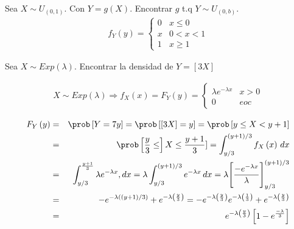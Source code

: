 \begin{Ejem}

Sea $X \sim U_{\left(0,1 \right)}$. Con $Y= g\left( X \right)$. Encontrar $g$ t.q $Y\sim U_{\left( 0,b\right)}$.\\

\begin{eqnarray*}  
 f_{Y}\left(y\right)= \left\{
 \begin{array}{cc} 
 0 & x\leq 0\\
 x & 0<x<1\\
 1 & x\geq 1     
 \end{array}
 \right.
 \end{eqnarray*}
 

\end{Ejem}

\begin{Ejem}

Sea $X \sim Exp  \left( \lambda \right)$. Encontrar la densidad de $Y = \left[ 3X \right] $

\begin{eqnarray*}
X \sim Exp \left( \lambda \right) \Rightarrow f_{X}\left( x \right) = F_{Y}\left(y\right) = \left\{\begin{array}{ll} \lambda  e^{-\lambda x} & x > 0 \\ 
0 & eoc 
\end{array}
\right.
\end{eqnarray*}

\begin{eqnarray*}
F_{Y}\left( y \right) &=& \prob \left[ Y= 7y \right] = \prob \left[ \left[ 3X\right] = y \right] = \prob \left[ y \leq X < y+1 \right]\\
&=& \prob \left[ \dfrac{y}{3} \leq \right] X \leq \dfrac{y+1}{3}] = \int_{y/3}^{(y+1)/3 }   f_{X} \left(x \right) \, dx \\
&=& \int_{y/3}^{\frac{y+1}{3} } \lambda e^{-\lambda x}, dx = \lambda \int_{y/3}^{(y+1)/3 } e^{-\lambda x} \, dx = \lambda \Bigg[ \dfrac{-e^{-\lambda x}}{\lambda} \Bigg]_{y/3}^{(y+1)/3} \\
&=& -e^{-\lambda \left((y+1)/3 \right)} + e^{-\lambda \left(\frac{y}{3} \right)} = -e^{-\lambda\left(\frac{y}{3} \right)} e^{-\lambda\left(\frac{1}{3} \right)}+ e^{-\lambda\left(\frac{y}{3}\right)}\\
&=& e^{-\lambda \left(\frac{y}{3} \right)}\left[ 1-e^{\frac{-\lambda}{3}}\right]
\end{eqnarray*}

\end{Ejem}

